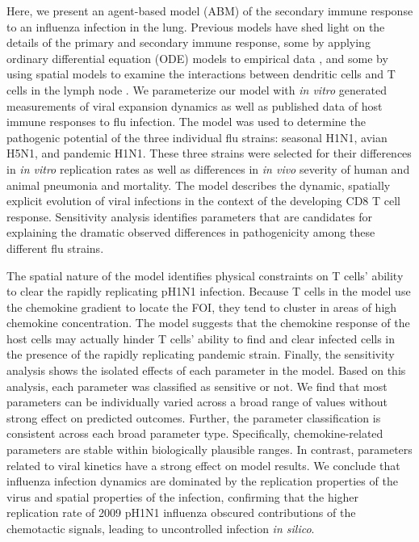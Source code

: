 \documentclass[10pt]{article}
\begin{document}
Here, we present an agent-based model (ABM) of the secondary immune response to an influenza infection in the lung.  Previous models have shed light on the details of the primary and secondary immune response, some by applying ordinary differential equation (ODE) models to empirical data \cite{Miao2010, Saenz2010, Handel2008, Lee2009, Murillo2013}, and some by using spatial models to examine the interactions between dendritic cells and T cells in the lymph node \cite{Beltman2007, Zheng2008, Vroomans2012, Textor2014}.  We parameterize our model with \textit{in vitro} generated measurements of viral expansion dynamics as well as published data of host immune responses to flu infection.  The model was used to determine the pathogenic potential of the three individual flu strains: seasonal H1N1, avian H5N1, and pandemic H1N1.  These three strains were selected for their differences in \textit{in vitro} replication rates \cite{Mitchell2011} as well as differences in \textit{in vivo} severity of human and animal pneumonia and mortality.  The model describes the dynamic, spatially explicit evolution of viral infections in the context of the developing CD8 T cell response.  Sensitivity analysis identifies parameters that are candidates for explaining the dramatic observed differences in pathogenicity among these different flu strains.


The spatial nature of the model identifies physical constraints on T cells' ability to clear the rapidly replicating pH1N1 infection.  Because T cells in the model use the chemokine gradient to locate the FOI, they tend to cluster in areas of high chemokine concentration.  The model suggests that the chemokine response of the host cells may actually hinder T cells' ability to find and clear infected cells in the presence of the rapidly replicating pandemic strain.  Finally, the sensitivity analysis shows the isolated effects of each parameter in the model.  Based on this analysis, each parameter was classified as sensitive or not.  We find that most parameters can be individually varied across a broad range of values without strong effect on predicted outcomes.  Further, the parameter classification is consistent across each broad parameter type. Specifically, chemokine-related parameters are stable within biologically plausible ranges.  In contrast, parameters related to viral kinetics have a strong effect on model results.  We conclude that influenza infection dynamics are dominated by the replication properties of the virus and spatial properties of the infection, confirming that the higher replication rate of 2009 pH1N1 influenza obscured contributions of the chemotactic signals, leading to uncontrolled infection \textit{in silico}.
\end{document}
